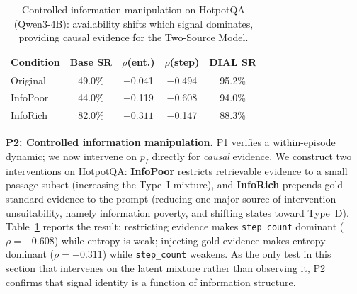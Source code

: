 \begin{table}
\vspace{-12pt}
\caption{Controlled information manipulation on HotpotQA
(Qwen3-4B): availability shifts which signal dominates,
providing causal evidence for the Two-Source Model.}
\vspace{-0.05in}
\label{tab:controlled}
\centering\footnotesize
\setlength{\tabcolsep}{4pt}
\begin{tabular}{lcccc}
\toprule
Condition & Base SR & $\rho$(ent.) & $\rho$(step) & DIAL SR \\
\midrule
Original  & 49.0\% & $-$0.041 & $-$0.494 & 95.2\% \\
InfoPoor  & 44.0\% & $+$0.119 & $\mathbf{-0.608}$ & 94.0\% \\
InfoRich  & 82.0\% & $\mathbf{+0.311}$ & $-$0.147 & 88.3\% \\
\bottomrule
\end{tabular}
\vspace{-10pt}
\end{table}
\textbf{P2: Controlled information manipulation.} P1 verifies a within-episode dynamic; we now intervene on $p_I$ directly for \emph{causal} evidence. We construct two
interventions on HotpotQA: \textbf{InfoPoor} restricts retrievable evidence to a small passage subset (increasing the Type~I mixture), and \textbf{InfoRich} prepends gold-standard evidence to the prompt (reducing one major source of intervention-unsuitability, namely information poverty, and shifting states toward Type~D). Table~\ref{tab:controlled}
reports the result: restricting evidence makes \texttt{step\_count} dominant ($\rho{=}{-}0.608$) while entropy
is weak; injecting gold evidence makes entropy dominant ($\rho{=}{+}0.311$) while \texttt{step\_count} weakens. As the
only test in this section that intervenes on the latent mixture rather than observing it, P2 confirms that signal identity is a function of information structure.

